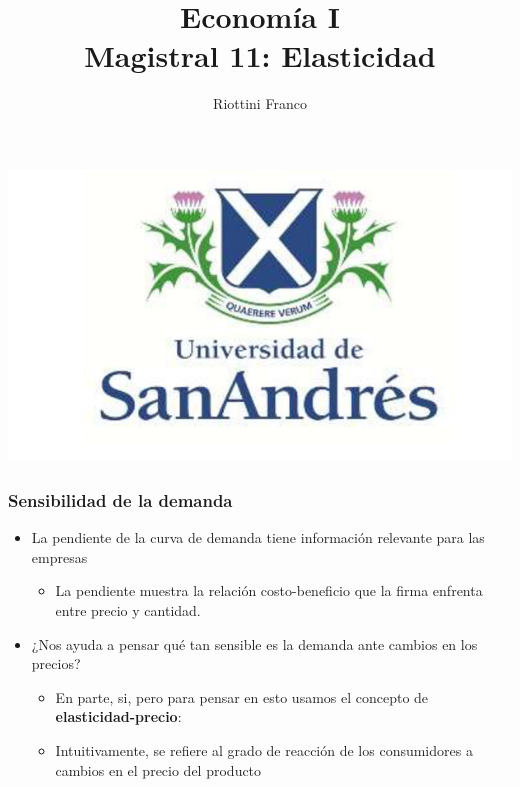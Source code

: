 \documentclass{beamer}
\title[Economía I]{Economía I \vspace{4mm}
\\ Magistral 11: Elasticidad}
\date{}
\author[Riottini]{Riottini Franco}
\institute[]{Universidad de San Andrés}
\begin{document}
\begin{frame}
\titlepage
\centering
\includegraphics[scale=0.2]{../Figures/logoUDESA.jpg} 
\end{frame}


\begin{frame}
\frametitle{Sensibilidad de la demanda}
\begin{itemize}
    \item La pendiente de la curva de demanda tiene información relevante para las empresas\vspace{2mm}
    \begin{itemize}
        \item La pendiente muestra la relación costo-beneficio que la firma enfrenta entre precio y cantidad.\vspace{4mm}
     \end{itemize}
    \item ¿Nos ayuda a pensar qué tan sensible es la demanda ante cambios en los precios?\vspace{2mm}
    \begin{itemize}
        \item En parte, si, pero para pensar en esto usamos el concepto de \textbf{elasticidad-precio}: \\\vspace{2mm}
      \item Intuitivamente, se refiere al grado de reacción de los consumidores a cambios en el precio del producto 
    \end{itemize}
    \end{itemize}
\end{frame}
\end{document}

